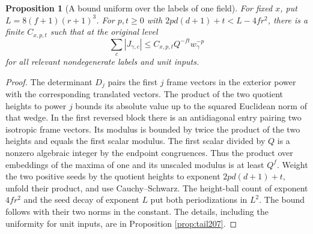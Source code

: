 \documentclass[a4paper,11pt]{article}
\newtheorem{proposition}{Proposition}[section]
\theoremstyle{definition}
\theoremstyle{remark}
\numberwithin{equation}{section}
\begin{document}
\begin{proposition}[A bound uniform over the labels of one field]
\label{prop:tail208}
For fixed \(x\), put \(L=8(f+1)(r+1)^3\). For \(p,t\ge0\)
with \(2pd(d+1)+t<L-4fr^2\), there is a finite \(C_{x,p,t}\)
such that at the original level
\[
      \sum_c |J_{\gamma,c}|
           \le C_{x,p,t} Q^{-ft} w_\gamma^{-p}
\]
for all relevant nondegenerate labels and unit inputs.
\end{proposition}
\begin{proof}
The determinant \(D_j\) pairs the first \(j\) frame vectors in
the exterior power with the corresponding translated vectors.
The product of the two quotient heights to power \(j\) bounds
its absolute value up to the squared Euclidean norm of that wedge.
In the first reversed block there is an antidiagonal entry pairing
two isotropic frame vectors. Its modulus is bounded by twice the
product of the two heights and equals the first scalar modulus.
The first scalar divided by \(Q\) is a nonzero algebraic integer
by the endpoint congruences. Thus the product over embeddings
of the maxima of one and its unscaled modulus is at least \(Q^f\).
Weight the two positive seeds by the quotient heights to exponent
\(2pd(d+1)+t\), unfold their product, and use Cauchy--Schwarz.
The height-ball count of exponent \(4fr^2\) and the seed decay
of exponent \(L\) put both periodizations in \(L^2\).
The bound follows with their two norms in the constant. The
details, including the uniformity for unit inputs, are in
Proposition \ref{prop:tail207}.
\end{proof}
\end{document}
